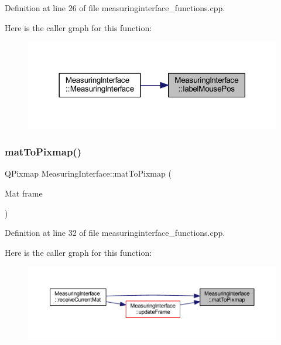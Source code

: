 Definition at line 26 of file measuringinterface\+\_\+functions.\+cpp.

Here is the caller graph for this function\+:
\nopagebreak
\begin{figure}[H]
\begin{center}
\leavevmode
\includegraphics[width=318pt]{classMeasuringInterface_a3e7eef22037ecb47ad2349205684c6ea_icgraph}
\end{center}
\end{figure}
\mbox{\label{classMeasuringInterface_ae5ad3ff4b380dd0465378dabc4265218}} 
\subsubsection{\texorpdfstring{matToPixmap()}{matToPixmap()}}
{\footnotesize\ttfamily Q\+Pixmap Measuring\+Interface\+::mat\+To\+Pixmap (\begin{DoxyParamCaption}\item[{Mat}]{frame }\end{DoxyParamCaption})\hspace{0.3cm}{\ttfamily [private]}}



Definition at line 32 of file measuringinterface\+\_\+functions.\+cpp.

Here is the caller graph for this function\+:
\nopagebreak
\begin{figure}[H]
\begin{center}
\leavevmode
\includegraphics[width=350pt]{classMeasuringInterface_ae5ad3ff4b380dd0465378dabc4265218_icgraph}
\end{center}
\end{figure}
\mbox{\label{classMeasuringInterface_a423a52e80d530b4cf1154422b3de5073}} 

